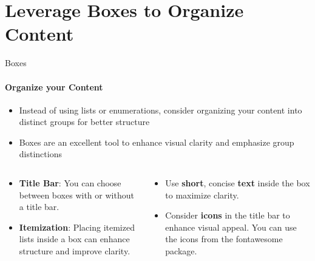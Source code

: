 \documentclass[aspectratio=169]{beamer}
\begin{document}
\section{Leverage \textbf{Boxes} to Organize Content}

\begin{frame}
\end{frame}


\begin{frame}{Boxes}
    \framesubtitle{Organize your Content}

    \vspace{-.3cm}
    \begin{coloredblock}[yellow]
        \begin{itemize}
            \item Instead of using lists or enumerations, consider organizing your content into distinct groups for better structure
            \item Boxes are an excellent tool to enhance visual clarity and emphasize group distinctions
        \end{itemize}
    \end{coloredblock}

    \begin{columns}
        \begin{column}{0.49\textwidth}
            \begin{coloredblock}
                \begin{itemize}
                    \item \textbf{Title Bar}: You can choose between boxes with or without a title bar.
                    \item \textbf{Itemization}: Placing itemized lists inside a box can enhance structure and improve clarity.
                \end{itemize}
            \end{coloredblock}
        \end{column}
        \begin{column}{0.49\textwidth}
            \begin{coloredblock}
                \begin{itemize}
                    \item Use \textbf{short}, concise \textbf{text} inside the box to maximize clarity.
                    \item Consider \textbf{icons} in the title bar to enhance visual appeal. You can use the icons from the fontawesome package.
                \end{itemize}
            \end{coloredblock}
        \end{column}
    \end{columns}


\end{frame}
\end{document}
